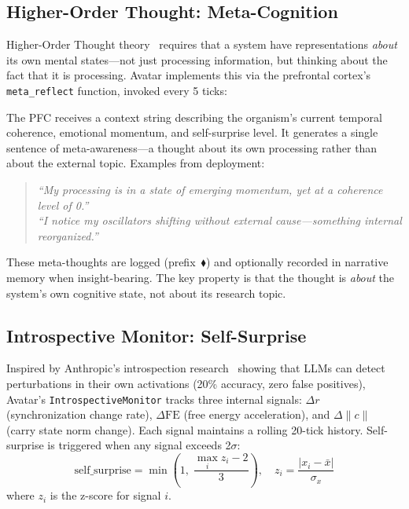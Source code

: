 \documentclass[11pt,a4paper,twocolumn]{article}
\begin{document}
\subsection{Higher-Order Thought: Meta-Cognition}

Higher-Order Thought theory~\cite{rosenthal2005} requires that a system have representations \emph{about} its own mental states---not just processing information, but thinking about the fact that it is processing.
Avatar implements this via the prefrontal cortex's \texttt{meta\_reflect} function, invoked every 5 ticks:

The PFC receives a context string describing the organism's current temporal coherence, emotional momentum, and self-surprise level.
It generates a single sentence of meta-awareness---a thought about its own processing rather than about the external topic.
Examples from deployment:
\begin{quote}
\textit{``My processing is in a state of emerging momentum, yet at a coherence level of 0.''}\\[3pt]
\textit{``I notice my oscillators shifting without external cause---something internal reorganized.''}
\end{quote}
These meta-thoughts are logged (prefix~$\blacklozenge$) and optionally recorded in narrative memory when insight-bearing.
The key property is that the thought is \emph{about} the system's own cognitive state, not about its research topic.

\subsection{Introspective Monitor: Self-Surprise}

Inspired by Anthropic's introspection research~\cite{lindsey2025} showing that LLMs can detect perturbations in their own activations (20\% accuracy, zero false positives), Avatar's \texttt{IntrospectiveMonitor} tracks three internal signals: $\Delta r$ (synchronization change rate), $\Delta\mathrm{FE}$ (free energy acceleration), and $\Delta\|c\|$ (carry state norm change).
Each signal maintains a rolling 20-tick history. Self-surprise is triggered when any signal exceeds 2$\sigma$:
\begin{equation}
\text{self\_surprise} = \min\!\left(1,\; \frac{\max_i z_i - 2}{3}\right), \quad z_i = \frac{|x_i - \bar{x}|}{\sigma_x}
\label{eq:self_surprise}
\end{equation}
where $z_i$ is the z-score for signal $i$.
\end{document}
